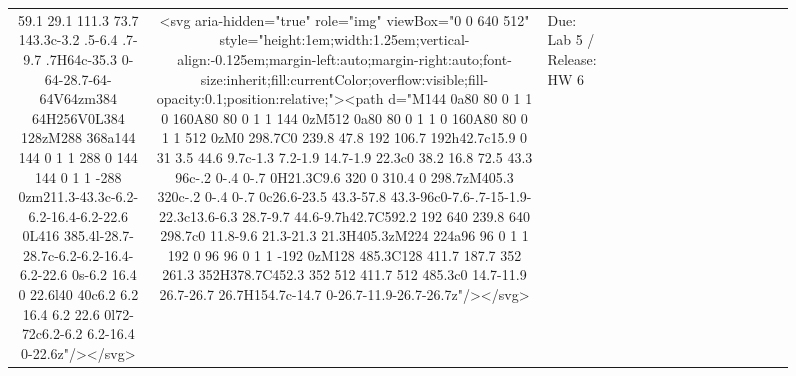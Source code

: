 \documentclass[
]{article}
\begin{document}
\begin{figure*}
\begin{longtable*}{cclllccccccccccl}
59.1 29.1 111.3 73.7 143.3c-3.2 .5-6.4 .7-9.7 .7H64c-35.3 0-64-28.7-64-64V64zm384 64H256V0L384 128zM288 368a144 144 0 1 1 288 0 144 144 0 1 1 -288 0zm211.3-43.3c-6.2-6.2-16.4-6.2-22.6 0L416 385.4l-28.7-28.7c-6.2-6.2-16.4-6.2-22.6 0s-6.2 16.4 0 22.6l40 40c6.2 6.2 16.4 6.2 22.6 0l72-72c6.2-6.2 6.2-16.4 0-22.6z"/></svg> & <svg aria-hidden="true" role="img" viewBox="0 0 640 512" style="height:1em;width:1.25em;vertical-align:-0.125em;margin-left:auto;margin-right:auto;font-size:inherit;fill:currentColor;overflow:visible;fill-opacity:0.1;position:relative;"><path d="M144 0a80 80 0 1 1 0 160A80 80 0 1 1 144 0zM512 0a80 80 0 1 1 0 160A80 80 0 1 1 512 0zM0 298.7C0 239.8 47.8 192 106.7 192h42.7c15.9 0 31 3.5 44.6 9.7c-1.3 7.2-1.9 14.7-1.9 22.3c0 38.2 16.8 72.5 43.3 96c-.2 0-.4 0-.7 0H21.3C9.6 320 0 310.4 0 298.7zM405.3 320c-.2 0-.4 0-.7 0c26.6-23.5 43.3-57.8 43.3-96c0-7.6-.7-15-1.9-22.3c13.6-6.3 28.7-9.7 44.6-9.7h42.7C592.2 192 640 239.8 640 298.7c0 11.8-9.6 21.3-21.3 21.3H405.3zM224 224a96 96 0 1 1 192 0 96 96 0 1 1 -192 0zM128 485.3C128 411.7 187.7 352 261.3 352H378.7C452.3 352 512 411.7 512 485.3c0 14.7-11.9 26.7-26.7 26.7H154.7c-14.7 0-26.7-11.9-26.7-26.7z"/></svg> & Due: Lab 5 / Release: HW 6 \\ 

\end{longtable*}
\end{figure*}
\end{document}
